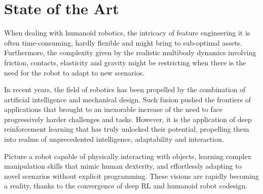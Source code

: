 \chapter{State of the Art}
\label{ch:stateoftheart}


When dealing with humanoid robotics, the intricacy of feature engineering it is often time-consuming, hardly flexible and might bring to sub-optimal assets. Furthermore, the complexity given by the realistic multibody dynamics involving friction, contacts, elasticity and gravity might be restricting when there is the need for the robot to adapt to new scenarios.

In recent years, the field of robotics has been propelled by the combination of artificial intelligence and mechanical design. Such fusion pushed the frontiers of applications that brought to an inexorable increase of the need to face progressively harder challenges and tasks. However, it is the application of deep reinforcement learning that has truly unlocked their potential, propelling them into realms of unprecedented intelligence, adaptability and interaction. 

Picture a robot capable of physically interacting with objects, learning complex manipulation skills that mimic human dexterity, and effortlessly adapting to novel scenarios without explicit programming. These visions are rapidly becoming a reality, thanks to the convergence of deep RL and humanoid robot codesign.

